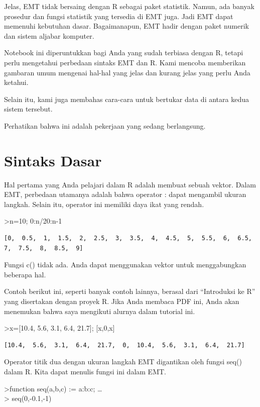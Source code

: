 \documentclass[
]{book}
\begin{document}
Jelas, EMT tidak bersaing dengan R sebagai paket statistik. Namun, ada banyak prosedur dan fungsi statistik yang tersedia di EMT juga. Jadi EMT dapat memenuhi kebutuhan dasar. Bagaimanapun, EMT hadir dengan paket numerik dan sistem aljabar komputer.

Notebook ini diperuntukkan bagi Anda yang sudah terbiasa dengan R, tetapi perlu mengetahui perbedaan sintaks EMT dan R. Kami mencoba memberikan gambaran umum mengenai hal-hal yang jelas dan kurang jelas yang perlu Anda ketahui.

Selain itu, kami juga membahas cara-cara untuk bertukar data di antara kedua sistem tersebut.

Perhatikan bahwa ini adalah pekerjaan yang sedang berlangsung.

\chapter{Sintaks Dasar}\label{sintaks-dasar}

Hal pertama yang Anda pelajari dalam R adalah membuat sebuah vektor. Dalam EMT, perbedaan utamanya adalah bahwa operator : dapat mengambil ukuran langkah. Selain itu, operator ini memiliki daya ikat yang rendah.

\textgreater n=10; 0:n/20:n-1

\begin{verbatim}
[0,  0.5,  1,  1.5,  2,  2.5,  3,  3.5,  4,  4.5,  5,  5.5,  6,  6.5,
7,  7.5,  8,  8.5,  9]
\end{verbatim}

Fungsi c() tidak ada. Anda dapat menggunakan vektor untuk menggabungkan beberapa hal.

Contoh berikut ini, seperti banyak contoh lainnya, berasal dari ``Introduksi ke R'' yang disertakan dengan proyek R. Jika Anda membaca PDF ini, Anda akan menemukan bahwa saya mengikuti alurnya dalam tutorial ini.

\textgreater x={[}10.4, 5.6, 3.1, 6.4, 21.7{]}; {[}x,0,x{]}

\begin{verbatim}
[10.4,  5.6,  3.1,  6.4,  21.7,  0,  10.4,  5.6,  3.1,  6.4,  21.7]
\end{verbatim}

Operator titik dua dengan ukuran langkah EMT digantikan oleh fungsi seq() dalam R. Kita dapat menulis fungsi ini dalam EMT.

\textgreater function seq(a,b,c) := a:b:c; \ldots{}\\
\textgreater{} seq(0,-0.1,-1)
\end{document}
